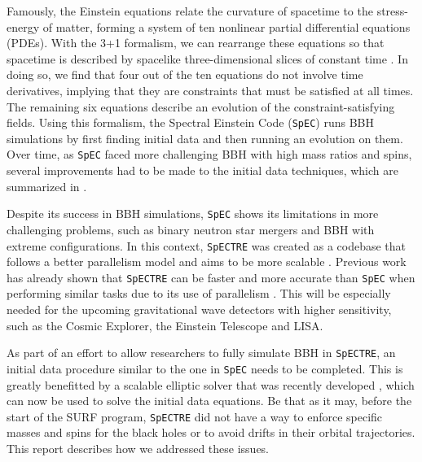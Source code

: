 \documentclass{../document}
\begin{document}
    Famously, the Einstein equations relate the curvature of spacetime to the stress-energy of matter, forming a system of ten nonlinear partial differential equations (PDEs). With the 3+1 formalism, we can rearrange these equations so that spacetime is described by spacelike three-dimensional slices of constant time \cite{Alcubierre}. In doing so, we find that four out of the ten equations do not involve time derivatives, implying that they are constraints that must be satisfied at all times. The remaining six equations describe an evolution of the constraint-satisfying fields. Using this formalism, the Spectral Einstein Code ({\tt SpEC}) \cite{SpEC} runs BBH simulations by first finding initial data and then running an evolution on them. Over time, as {\tt SpEC} faced more challenging BBH with high mass ratios and spins, several improvements had to be made to the initial data techniques, which are summarized in \cite{Serguei}.
    
    Despite its success in BBH simulations, {\tt SpEC} shows its limitations in more challenging problems, such as binary neutron star mergers and BBH with extreme configurations. In this context, {\tt SpECTRE} \cite{SpECTRE} was created as a codebase that follows a better parallelism model and aims to be more scalable \cite{Kidder}. Previous work has already shown that {\tt SpECTRE} can be faster and more accurate than {\tt SpEC} when performing similar tasks due to its use of parallelism \cite{Vu}. This will be especially needed for the upcoming gravitational wave detectors with higher sensitivity, such as the Cosmic Explorer, the Einstein Telescope and LISA.
    
    As part of an effort to allow researchers to fully simulate BBH in {\tt SpECTRE}, an initial data procedure similar to the one in {\tt SpEC} needs to be completed. This is greatly benefitted by a scalable elliptic solver that was recently developed \cite{Vu}, which can now be used to solve the initial data equations. Be that as it may, before the start of the SURF program, {\tt SpECTRE} did not have a way to enforce specific masses and spins for the black holes or to avoid drifts in their orbital trajectories. This report describes how we addressed these issues.
\end{document}
